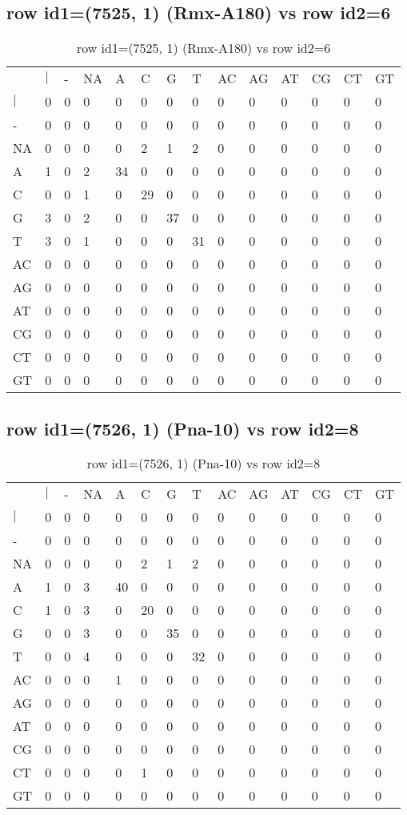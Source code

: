 \subsection{row id1=(7525, 1) (Rmx-A180) vs row id2=6}
\begin{center}
\begin{longtable}{|l|l|l|l|l|l|l|l|l|l|l|l|l|l|}
\caption{row id1=(7525, 1) (Rmx-A180) vs row id2=6} \label{table_dm338}\\
\hline
\\
\hline
&$|$&-&NA&A&C&G&T&AC&AG&AT&CG&CT&GT\\
$|$&0&0&0&0&0&0&0&0&0&0&0&0&0\\
-&0&0&0&0&0&0&0&0&0&0&0&0&0\\
NA&0&0&0&0&2&1&2&0&0&0&0&0&0\\
A&1&0&2&34&0&0&0&0&0&0&0&0&0\\
C&0&0&1&0&29&0&0&0&0&0&0&0&0\\
G&3&0&2&0&0&37&0&0&0&0&0&0&0\\
T&3&0&1&0&0&0&31&0&0&0&0&0&0\\
AC&0&0&0&0&0&0&0&0&0&0&0&0&0\\
AG&0&0&0&0&0&0&0&0&0&0&0&0&0\\
AT&0&0&0&0&0&0&0&0&0&0&0&0&0\\
CG&0&0&0&0&0&0&0&0&0&0&0&0&0\\
CT&0&0&0&0&0&0&0&0&0&0&0&0&0\\
GT&0&0&0&0&0&0&0&0&0&0&0&0&0\\
\hline
\end{longtable}
\end{center}

\subsection{row id1=(7526, 1) (Pna-10) vs row id2=8}
\begin{center}
\begin{longtable}{|l|l|l|l|l|l|l|l|l|l|l|l|l|l|}
\caption{row id1=(7526, 1) (Pna-10) vs row id2=8} \label{table_dm340}\\
\hline
\\
\hline
&$|$&-&NA&A&C&G&T&AC&AG&AT&CG&CT&GT\\
$|$&0&0&0&0&0&0&0&0&0&0&0&0&0\\
-&0&0&0&0&0&0&0&0&0&0&0&0&0\\
NA&0&0&0&0&2&1&2&0&0&0&0&0&0\\
A&1&0&3&40&0&0&0&0&0&0&0&0&0\\
C&1&0&3&0&20&0&0&0&0&0&0&0&0\\
G&0&0&3&0&0&35&0&0&0&0&0&0&0\\
T&0&0&4&0&0&0&32&0&0&0&0&0&0\\
AC&0&0&0&1&0&0&0&0&0&0&0&0&0\\
AG&0&0&0&0&0&0&0&0&0&0&0&0&0\\
AT&0&0&0&0&0&0&0&0&0&0&0&0&0\\
CG&0&0&0&0&0&0&0&0&0&0&0&0&0\\
CT&0&0&0&0&1&0&0&0&0&0&0&0&0\\
GT&0&0&0&0&0&0&0&0&0&0&0&0&0\\
\hline
\end{longtable}
\end{center}

